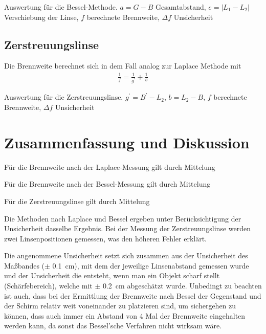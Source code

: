\documentclass{article}
\begin{document}
\begin{table}[H]
\caption{Auswertung für die Bessel-Methode. $a = G-B$ Gesamtabstand, $e = |L_1-L_2|$ Verschiebung der Linse, $f$ berechnete Brennweite, $\Delta f$ Unsicherheit}
\label{tab:bessel_auswertung}
\centering

\end{table}


\subsection{Zerstreuungslinse}

Die Brennweite berechnet sich in dem Fall analog zur Laplace Methode mit
\begin{align}
\frac1f = \frac{1}{g^\prime} + \frac1b
\end{align}


\begin{table}[H]
\caption{Auswertung für die Zerstreuungslinse. $g^\prime = B^\prime - L_2$, $b = L_2 -B$, $f$ berechnete Brennweite, $\Delta f$ Unsicherheit}
\label{tab:zerstreuungslinse_auswertung}
\centering

\end{table}




\section{Zusammenfassung und Diskussion}

Für die Brennweite nach der Laplace-Messung gilt durch Mittelung 


Für die Brennweite nach der Bessel-Messung gilt durch Mittelung 


Für die Zerstreuungslinse gilt durch Mittelung 


Die Methoden nach Laplace und Bessel ergeben unter Berücksichtigung der Unsicherheit dasselbe Ergebnis. Bei der Messung der Zerstreuungslinse werden zwei Linsenpositionen gemessen, was den höheren Fehler erklärt.

Die angenommene Unsicherheit setzt sich zusammen aus der Unsicherheit des Maßbandes ($\pm$ 0.1~cm), mit dem der jeweilige Linsenabstand gemessen wurde und der Unsicherheit die entsteht, wenn man ein Objekt scharf stellt (Schärfebereich), welche mit $\pm$ 0.2~cm abgeschätzt wurde.
Unbedingt zu beachten ist auch, dass bei der Ermittlung der Brennweite nach Bessel der Gegenstand und der Schirm relativ weit voneinander zu platzieren sind, um sichergehen zu können, dass auch immer ein Abstand von 4 Mal der Brennweite eingehalten werden kann, da sonst das Bessel'sche Verfahren nicht wirksam wäre. 
\end{document}
